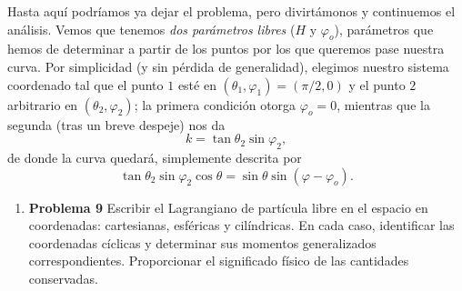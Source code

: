 \documentclass{article}
\begin{document}
Hasta aqu\'i podr\'iamos ya dejar el problema, pero divirt\'amonos y continuemos el an\'alisis. Vemos que tenemos \textit{dos par\'ametros libres} ($H$ y $\varphi_o$), par\'ametros que hemos de determinar a partir de los puntos por los que queremos pase nuestra curva. Por simplicidad (y sin p\'erdida de generalidad), elegimos nuestro sistema coordenado tal que el punto $1$ est\'e en $(\theta_1,\varphi_1)=(\pi/2,0)$ y el punto $2$ arbitrario en $(\theta_2,\varphi_2)$; la primera condici\'on otorga $\varphi_o=0$, mientras que la segunda (tras un breve despeje) nos da
\begin{equation*}
    k = \tan\theta_2\sin\varphi_2,
\end{equation*}
de donde la curva quedar\'a, simplemente descrita por
\begin{equation}
    \tan\theta_2\sin\varphi_2\cos\theta=\sin\theta\sin(\varphi-\varphi_o).
\end{equation} 

\vspace{0.5cm}
\begin{center}
\end{center}  \vspace{0.5cm}

\begin{enumerate}[label={{\textcolor{trueblue}{\textbf{Pr.} \arabic*.9}}}, start=2]
  \item \textbf{Problema 9} Escribir el Lagrangiano de partícula libre en el espacio en coordenadas: cartesianas, esféricas y cilíndricas. En cada caso, identificar las coordenadas cíclicas y determinar sus momentos generalizados correspondientes. Proporcionar el significado físico de las cantidades conservadas. 
\end{enumerate}
\end{document}
